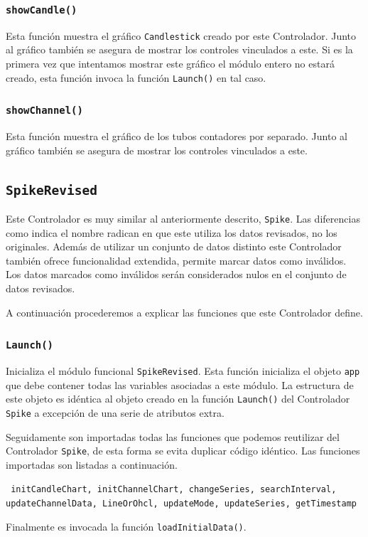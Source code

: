 		\subsubsection{\texttt{showCandle()}}
			Esta función muestra el gráfico \texttt{Candlestick} creado por este Controlador. Junto al gráfico también se asegura de
			mostrar los controles vinculados a este. Si es la primera vez que intentamos mostrar este gráfico el módulo entero no estará
			creado, esta función invoca la función \texttt{Launch()} en tal caso.
		\subsubsection{\texttt{showChannel()}}
			Esta función muestra el gráfico de los tubos contadores por separado. Junto al gráfico también se asegura de mostrar los
			controles vinculados a este.

	\subsection{\texttt{SpikeRevised}}
		Este Controlador es muy similar al anteriormente descrito, \texttt{Spike}. Las diferencias como indica el nombre radican en que este
		utiliza los datos revisados, no los originales. Además de utilizar un conjunto de datos distinto este Controlador también ofrece
		funcionalidad extendida, permite marcar datos como inválidos. Los datos marcados como inválidos serán considerados nulos en el
		conjunto de datos revisados.
		\par
		A continuación procederemos a explicar las funciones que este Controlador define.
		\subsubsection{\texttt{Launch()}}
			Inicializa el módulo funcional \texttt{SpikeRevised}. Esta función inicializa el objeto \texttt{app} que debe contener todas
			las variables asociadas a este módulo. La estructura de este objeto es idéntica al objeto creado en la función
			\texttt{Launch()} del Controlador \texttt{Spike} a excepción de una serie de atributos extra. 
			\par
			Seguidamente son importadas todas las funciones que podemos reutilizar del Controlador \texttt{Spike}, de esta forma se evita
			duplicar código idéntico. Las funciones importadas son listadas a continuación.
				\begin{center} \texttt{	initCandleChart, initChannelChart, changeSeries, searchInterval, updateChannelData,
				  			LineOrOhcl, updateMode, updateSeries, getTimestamp}
				\end{center}
			Finalmente es invocada la función \texttt{loadInitialData()}.
